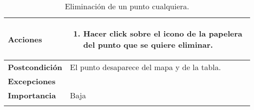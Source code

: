 \begin{longtable}[H]{@{}l|l@{}}
\begin{minipage}[t]{0.23\columnwidth}
		\textbf{Acciones}\strut
	\end{minipage} & \begin{minipage}[t]{0.71\columnwidth}\raggedright
		\begin{enumerate}
			\def\labelenumi{\arabic{enumi}.}
			\tightlist
			\item Hacer click sobre el icono de la papelera del punto que se quiere eliminar.
		\end{enumerate}
	\end{minipage}\tabularnewline
	\midrule
	\begin{minipage}[t]{0.23\columnwidth}\raggedright\strut
		\textbf{Postcondición}\strut
	\end{minipage} & \begin{minipage}[t]{0.71\columnwidth}\raggedright\strut
		El punto desaparece del mapa y de la tabla.\strut
	\end{minipage}\tabularnewline
	\midrule
	\begin{minipage}[t]{0.23\columnwidth}\raggedright\strut
		\textbf{Excepciones}\strut
	\end{minipage} & \begin{minipage}[t]{0.71\columnwidth}\raggedright
		
	\end{minipage}\tabularnewline
	\midrule
	\begin{minipage}[t]{0.23\columnwidth}\raggedright\strut
		\textbf{Importancia}\strut
	\end{minipage} & \begin{minipage}[t]{0.71\columnwidth}\raggedright\strut
		Baja\strut
	\end{minipage}\tabularnewline
	\bottomrule
	\caption{Eliminación de un punto cualquiera.}
	\label{cu:2.2.2}
\end{longtable}
\newpage

